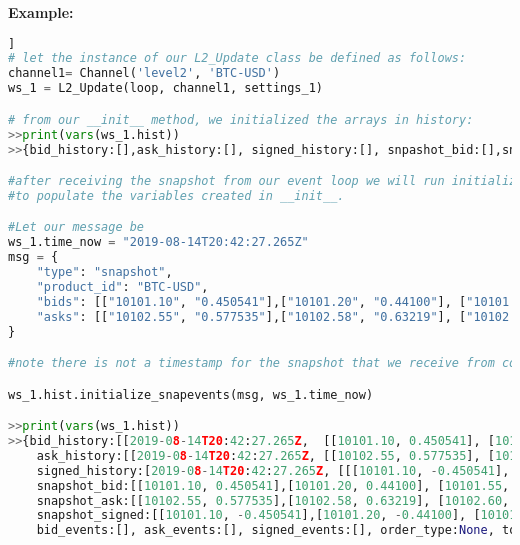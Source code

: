 \textbf{Example:}
\begin{lstlisting}[language=Python]]
# let the instance of our L2_Update class be defined as follows:
channel1= Channel('level2', 'BTC-USD')
ws_1 = L2_Update(loop, channel1, settings_1)

# from our __init__ method, we initialized the arrays in history:
>>print(vars(ws_1.hist))
>>{bid_history:[],ask_history:[], signed_history:[], snpashot_bid:[],snapshot_ask:[],snapshot_signed:[], bid_events:[], ask_events:[], signed_events:[], order_type:None, token:False, position:0, event_size:0}

#after receiving the snapshot from our event loop we will run initialize_snap_events
#to populate the variables created in __init__.

#Let our message be
ws_1.time_now = "2019-08-14T20:42:27.265Z"
msg = {
	"type": "snapshot",
	"product_id": "BTC-USD",
	"bids": [["10101.10", "0.450541"],["10101.20", "0.44100"], ["10101.55", "0.013400"]],
	"asks": [["10102.55", "0.577535"],["10102.58", "0.63219"], ["10102.60", "0.803200"]]
}

#note there is not a timestamp for the snapshot that we receive from coinbase so it is passed from the datetime.utcnow() from the init method of the L2_Update class. 

ws_1.hist.initialize_snapevents(msg, ws_1.time_now)

>>print(vars(ws_1.hist))
>>{bid_history:[[2019-08-14T20:42:27.265Z,  [[10101.10, 0.450541], [10101.20, 0.44100], [10101.55, 0.013400]]]],
	ask_history:[[2019-08-14T20:42:27.265Z, [[10102.55, 0.577535], [10102.58, 0.63219], [10102.60, 0.803200]]]],
	signed_history:[2019-08-14T20:42:27.265Z, [[[10101.10, -0.450541], [10101.20, -0.44100], [10101.55, -0.013400], [10102.55, 0.577535], [10102.58, 0.63219], [10102.60, 0.803200]]]],
	snapshot_bid:[[10101.10, 0.450541],[10101.20, 0.44100], [10101.55, 0.013400]], 
	snapshot_ask:[[10102.55, 0.577535],[10102.58, 0.63219], [10102.60, 0.803200]], 
	snapshot_signed:[[10101.10, -0.450541],[10101.20, -0.44100], [10101.55, -0.013400], [10102.55, 0.577535],[10102.58, 0.63219], [10102.60, 0.803200]],
	bid_events:[], ask_events:[], signed_events:[], order_type:None, token:False, position:0, event_size:0}
\end{lstlisting}
